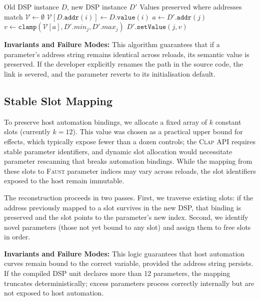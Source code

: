 \documentclass[twoside,a4paper]{article}
\newcommand{\F}{\textsc{Faust}}
\newcommand{\CLAP}{\textsc{Clap}}
\begin{document}
\begin{algorithm}[ht]
\caption{Parameter Value Preservation}
\label{alg:preservation}
\begin{algorithmic}[1]
\Require Old DSP instance $D$, new DSP instance $D'$
\Ensure Values preserved where addresses match
\State $\mathcal{V} \gets \emptyset$ 
    \State $\mathcal{V}[D.\texttt{addr}(i)] \gets D.\texttt{value}(i)$
\EndFor
{}
    \State $a \gets D'.\texttt{addr}(j)$
        \State $v \gets \texttt{clamp}(\mathcal{V}[a], D'.\textit{min}_j, D'.\textit{max}_j)$
        \State $D'.\texttt{setValue}(j, v)$
    \EndIf
\EndFor
\end{algorithmic}
\end{algorithm}

\textbf{Invariants and Failure Modes:} This algorithm guarantees that if a parameter's address string remains identical across reloads, its semantic value is preserved. If the developer explicitly renames the path in the source code, the link is severed, and the parameter reverts to its initialisation default. 

\subsection{Stable Slot Mapping}

To preserve host automation bindings, we allocate a fixed array of $k$ constant slots (currently $k = 12$). This value was chosen as a practical upper bound for effects, which typically expose fewer than a dozen controls; the \CLAP{} API requires stable parameter identifiers, and dynamic slot allocation would necessitate parameter rescanning that breaks automation bindings. While the mapping from these slots to \F{} parameter indices may vary across reloads, the slot identifiers exposed to the host remain immutable.

The reconstruction proceeds in two passes. First, we traverse existing slots: if the address previously mapped to a slot survives in the new DSP, that binding is preserved and the slot points to the parameter's new index. Second, we identify novel parameters (those not yet bound to any slot) and assign them to free slots in order.

\textbf{Invariants and Failure Modes:} This logic guarantees that host automation curves remain bound to the correct variable, provided the address string persists. If the compiled DSP unit declares more than 12 parameters, the mapping truncates deterministically; excess parameters process correctly internally but are not exposed to host automation. 
\end{document}
